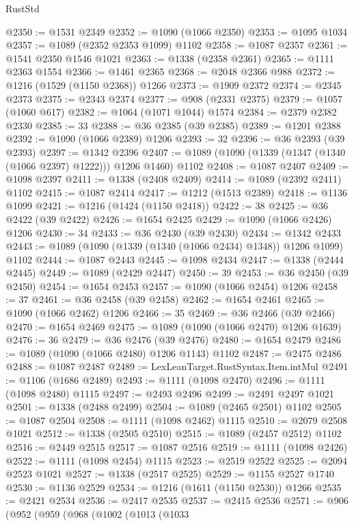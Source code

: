 \begin{lexlean}{RustStd}
\begin{coremodule}
@2350 := @1531 @2349
@2352 := @1090 (@1066 @2350)
@2353 := @1095 @1034
@2357 := @1089 (@2352 @2353 @1099) @1102
@2358 := @1087 @2357
@2361 := @1541 @2350 @1546 @1021
@2363 := @1338 (@2358 @2361)
@2365 := @1111 @2363 @1554
@2366 := @1461 @2365
@2368 := @2048 @2366 @988
@2372 := @1216 (@1529 (@1150 @2368)) @1266
@2373 := @1909 @2372
@2374 := @2345 @2373
@2375 := @2343 @2374
@2377 := @908 (@2331 @2375)
@2379 := @1057 (@1060 @617)
@2382 := @1064 (@1071 @1044) @1574
@2384 := @2379 @2382 @2330
@2385 := 33
@2388 := @36 @2385 (@39 @2385)
@2389 := @1201 @2388
@2392 := @1090 (@1066 @2389) @1206
@2393 := 32
@2396 := @36 @2393 (@39 @2393)
@2397 := @1342 @2396
@2407 := @1089 (@1090 (@1339 (@1347 (@1340 (@1066 @2397) @1222))) @1206 @1460) @1102
@2408 := @1087 @2407
@2409 := @1098 @2397
@2411 := @1338 (@2408 @2409)
@2414 := @1089 (@2392 @2411) @1102
@2415 := @1087 @2414
@2417 := @1212 (@1513 @2389)
@2418 := @1136 @1099
@2421 := @1216 (@1424 (@1150 @2418))
@2422 := 38
@2425 := @36 @2422 (@39 @2422)
@2426 := @1654 @2425
@2429 := @1090 (@1066 @2426) @1206
@2430 := 34
@2433 := @36 @2430 (@39 @2430)
@2434 := @1342 @2433
@2443 := @1089 (@1090 (@1339 (@1340 (@1066 @2434) @1348)) @1206 @1099) @1102
@2444 := @1087 @2443
@2445 := @1098 @2434
@2447 := @1338 (@2444 @2445)
@2449 := @1089 (@2429 @2447)
@2450 := 39
@2453 := @36 @2450 (@39 @2450)
@2454 := @1654 @2453
@2457 := @1090 (@1066 @2454) @1206
@2458 := 37
@2461 := @36 @2458 (@39 @2458)
@2462 := @1654 @2461
@2465 := @1090 (@1066 @2462) @1206
@2466 := 35
@2469 := @36 @2466 (@39 @2466)
@2470 := @1654 @2469
@2475 := @1089 (@1090 (@1066 @2470) @1206 @1639)
@2476 := 36
@2479 := @36 @2476 (@39 @2476)
@2480 := @1654 @2479
@2486 := @1089 (@1090 (@1066 @2480) @1206 @1143) @1102
@2487 := @2475 @2486
@2488 := @1087 @2487
@2489 := LexLeanTarget.RustSyntax.Item.intMul
@2491 := @1106 (@1686 @2489)
@2493 := @1111 (@1098 @2470)
@2496 := @1111 (@1098 @2480) @1115
@2497 := @2493 @2496
@2499 := @2491 @2497 @1021
@2501 := @1338 (@2488 @2499)
@2504 := @1089 (@2465 @2501) @1102
@2505 := @1087 @2504
@2508 := @1111 (@1098 @2462) @1115
@2510 := @2079 @2508 @1021
@2512 := @1338 (@2505 @2510)
@2515 := @1089 (@2457 @2512) @1102
@2516 := @2449 @2515
@2517 := @1087 @2516
@2519 := @1111 (@1098 @2426)
@2522 := @1111 (@1098 @2454) @1115
@2523 := @2519 @2522
@2525 := @2094 @2523 @1021
@2527 := @1338 (@2517 @2525)
@2529 := @1155 @2527 @1740
@2530 := @1136 @2529
@2534 := @1216 (@1611 (@1150 @2530)) @1266
@2535 := @2421 @2534
@2536 := @2417 @2535
@2537 := @2415 @2536
@2571 := @906
    (@952
      (@959
        (@968
          (@1002
            (@1013
              (@1033

\end{coremodule}
\end{lexlean}
